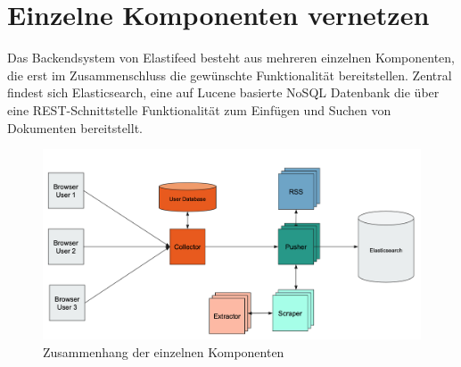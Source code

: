 \section{Einzelne Komponenten vernetzen}

Das Backendsystem von Elastifeed besteht aus mehreren einzelnen Komponenten, die erst im Zusammenschluss die gewünschte Funktionalität bereitstellen.
Zentral findest sich Elasticsearch, eine auf Lucene basierte NoSQL Datenbank die über eine REST-Schnittstelle Funktionalität zum Einfügen und Suchen von Dokumenten bereitstellt.

\begin{figure}[t]
        \centering
        \includegraphics[width=\linewidth]{images/architecture.png}
        \caption{Zusammenhang der einzelnen Komponenten}
        \label{deploy:image:architecture}
 \end{figure}
